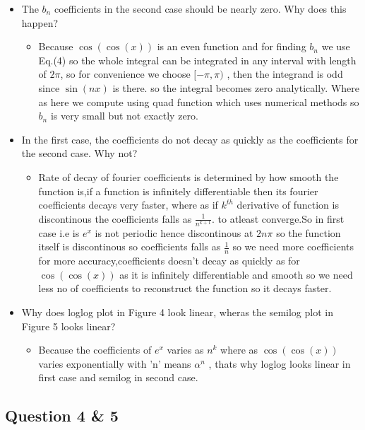 \documentclass[a4paper]{article}
\providecommand{\tightlist}{%
      \setlength{\itemsep}{0pt}\setlength{\parskip}{0pt}}
\begin{document}
\begin{itemize}
\tightlist
\item
  The \(b_{n}\) coefficients in the second case should be nearly zero.
  Why does this happen?
  \begin{itemize}
  \tightlist
	\item
  Because \(\cos(\cos(x))\) is an even function and for finding
  \(b_{n}\) we use Eq.(4) so the whole integral can be integrated in any
  interval with length of \(2\pi\), so for convenience we choose
  \([-\pi,\pi)\) , then the integrand is odd since \(\sin(nx)\) is
  there. so the integral becomes zero analytically. Where as here we
  compute using quad function which uses numerical methods so \(b_{n}\)
  is very small but not exactly zero.
  \end{itemize}
\item
  In the first case, the coefficients do not decay as quickly as the
  coefficients for the second case. Why not?
	\begin{itemize}
	\item
  Rate of decay of fourier coefficients is determined by how smooth the
  function is,if a function is infinitely differentiable then its
  fourier coefficients decays very faster, where as if \(k^{th}\)
  derivative of function is discontinous the coefficients falls as
  \(\frac{1}{n^{k+1}}\). to atleast converge.So in first case i.e is
  \(e^{x}\) is not periodic hence discontinous at \(2n\pi\) so the
  function itself is discontinous so coefficients falls as
  \(\frac{1}{n}\) so we need more coefficients for more
  accuracy,coefficients doesn't decay as quickly as for
  \(\cos(\cos(x))\) as it is infinitely differentiable and smooth so we
  need less no of coefficients to reconstruct the function so it decays
  faster.
\end{itemize}		
	
\item
  Why does loglog plot in Figure 4 look linear, wheras the semilog plot
  in Figure 5 looks linear?
  \begin{itemize}
  \item
  Because the coefficients of \(e^{x}\) varies as \(n^{k}\) where as
  \(\cos(\cos(x))\) varies exponentially with 'n' means \(\alpha^{n}\) ,
  thats why loglog looks linear in first case and semilog in second
  case.
\end{itemize}
  \end{itemize}


    \subsection{Question 4 \& 5}\label{question-4-5}
\end{document}
